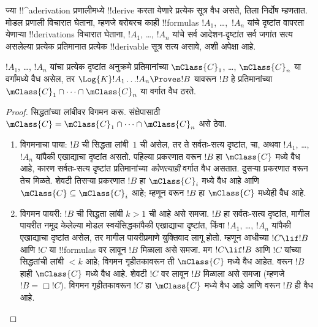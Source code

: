 \documentclass[../../../include/open-logic-section]{subfiles}
\begin{document}


ज्या !!^a{derivation} प्रणालीमध्ये !!{derive}
करता येणारे प्रत्येक सूत्र वैध असते, तिला निर्दोष
म्हणतात. मोडल प्रणाली विचारात घेताना, म्हणजे
 बरोबरच काही !!{formula}s $!A_1$,
\dots,~$!A_n$ यांचे दृष्टांत वापरता येणाऱ्या
!!{derivation}s विचारात घेताना, $!A_1$, \dots,
$!A_n$ यांचे सर्व आदेशन-दृष्टांत सर्व जगांत सत्य असलेल्या
प्रत्येक प्रतिमानात प्रत्येक !!{derivable} सूत्र सत्य असावे,
अशी अपेक्षा आहे.

\begin{thm}[निर्दोषता प्रमेय]
  $!A_1$, \dots, $!A_n$ यांचा प्रत्येक दृष्टांत
  अनुक्रमे प्रतिमानांच्या $\mClass{C}_1$, \dots,
  $\mClass{C}_n$ या वर्गांमध्ये वैध असेल,
  तर $\Log{K}!A_1\dots !A_n
  \Proves !B$ यावरून $!B$ हे प्रतिमानांच्या
  $\mClass{C}_1 \cap \dots \cap \mClass{C}_n$
  या वर्गात वैध ठरते.
\end{thm}

\begin{proof}
  सिद्धतांच्या लांबीवर विगमन करू. संक्षेपासाठी
  $\mClass{C} =
  \mClass{C}_1 \cap \dots \cap \mClass{C}_n$ असे ठेवा.
  \begin{enumerate}
  \item विगमनाचा पाया: $!B$ ची सिद्धता लांबी~$1$
    ची असेल, तर ते सर्वतः-सत्य दृष्टांत,
     चा,
    अथवा $!A_1$, \dots,~$!A_n$ यांपैकी
    एखाद्याचा दृष्टांत असतो. पहिल्या प्रकरणात
     वरून $!B$
    हा $\mClass{C}$ मध्ये वैध आहे, कारण सर्वतः-सत्य
    दृष्टांत प्रतिमानांच्या \emph{कोणत्याही} वर्गात
    वैध असतात. दुसऱ्या प्रकरणात
     वरून तेच
    मिळते. शेवटी तिसऱ्या प्रकरणात $!B$ हा
    $\mClass{C}_i$ मध्ये वैध आहे आणि
    $\mClass{C} \subseteq \mClass{C}_i$ आहे;
    म्हणून 
    वरून $!B$ हा $\mClass{C}$ मध्येही वैध आहे.
  \item विगमन पायरी: $!B$ ची सिद्धता लांबी $k>1$
    ची आहे असे समजा. $!B$ हा सर्वतः-सत्य दृष्टांत,
    मागील पायरीत नमूद केलेल्या मोडल स्वयंसिद्धकांपैकी
    एखाद्याचा दृष्टांत, किंवा $!A_1$, \dots,
    $!A_n$ यांपैकी एखाद्याचा दृष्टांत असेल,
    तर मागील पायरीप्रमाणे युक्तिवाद लागू होतो.
    म्हणून आधीच्या
    $!C \lif !B$ आणि $!C$ या !!{formula}s वर
    \MP{} लावून $!B$ मिळाला असे समजा. मग
    $!C \lif !B$ आणि $!C$ यांच्या सिद्धतांची
    लांबी $<k$ आहे; विगमन गृहीतकावरून ती
    $\mClass{C}$ मध्ये वैध आहेत.
     वरून $!B$
    हाही $\mClass{C}$ मध्ये वैध आहे. शेवटी
    $!C$ वर \Nec{} लावून $!B$ मिळाला असे समजा
    (म्हणजे $!B = \Box!C$). विगमन गृहीतकावरून
    $!C$ हा $\mClass{C}$ मध्ये वैध आहे आणि
     वरून $!B$ ही
    वैध आहे.
  \end{enumerate}
\end{proof}
\end{document}
